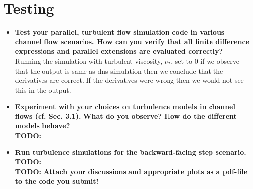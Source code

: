 \documentclass[a4paper]{article}
\newcommand{\td}[1]{
	\textbf{\color{red}TODO: {#1}}
}
\begin{document}
\section{Testing}
\begin{itemize}
	\item \textbf{Test your parallel, turbulent flow simulation code in various channel flow scenarios. How can you verify that all finite difference expressions and parallel extensions are evaluated correctly?}\\
	Running the simulation with turbulent viscosity, $\nu_{T}$, set to 0 if we observe that the output is same as dns simulation then we conclude that the derivatives are correct. If the derivatives were wrong then we would not see this in the output.
	\item \textbf{Experiment with your choices on turbulence models in channel flows (cf. Sec. 3.1). What do you observe? How do the different models behave?}\\
	\td{}
	\item\textbf{Run turbulence simulations for the backward-facing step scenario.}\\
	\td{}\\
	\td{Attach your discussions and appropriate plots as a pdf-file to the code you submit!}
\end{itemize}
\end{document}
